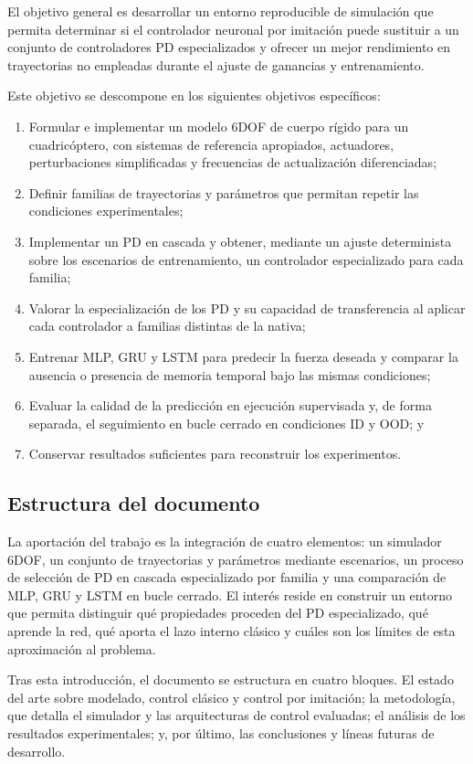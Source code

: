El objetivo general es desarrollar un entorno reproducible de simulación que 
permita determinar si el controlador neuronal por imitación puede sustituir 
a un conjunto de controladores PD especializados y ofrecer un mejor rendimiento
en trayectorias no empleadas durante el ajuste de ganancias y entrenamiento.

Este objetivo se descompone en los siguientes objetivos específicos:

\begin{enumerate}
  \item Formular e implementar un modelo 6DOF de cuerpo rígido para un
  cuadricóptero, con sistemas de referencia apropiados, actuadores,  perturbaciones 
  simplificadas y frecuencias de actualización diferenciadas;
  \item Definir familias de trayectorias y parámetros que permitan repetir las
  condiciones experimentales;
  \item Implementar un PD en cascada y obtener, mediante un ajuste determinista
  sobre los escenarios de entrenamiento, un controlador especializado para cada familia;
  \item Valorar la especialización de los PD y su capacidad de  transferencia 
  al aplicar cada controlador a familias distintas de la nativa;
  \item Entrenar MLP, GRU y LSTM para predecir la fuerza deseada y comparar la
  ausencia o presencia de memoria temporal bajo las mismas condiciones;
  \item Evaluar la calidad de la predicción en ejecución supervisada y, de forma separada,
  el seguimiento en bucle cerrado en condiciones ID y OOD; y
  \item Conservar resultados suficientes para reconstruir los experimentos.
\end{enumerate}

\subsection{Estructura del documento}
\label{subsec:estructura-documento}

La aportación del trabajo es la integración de cuatro elementos: un simulador 
6DOF, un conjunto de trayectorias y parámetros mediante escenarios, un proceso de
selección de PD en cascada especializado por familia y una comparación de MLP, GRU 
y LSTM en bucle cerrado. El interés reside en construir un entorno que permita distinguir
qué propiedades proceden del PD especializado, qué aprende la red, qué aporta el lazo interno 
clásico y cuáles son los límites de esta aproximación al problema.

Tras esta introducción, el documento se estructura en cuatro bloques. El estado del arte
sobre modelado, control clásico y control por imitación; la metodología, que detalla el 
simulador y las arquitecturas de control evaluadas; el análisis de los resultados experimentales; 
y, por último, las conclusiones y líneas futuras de desarrollo.
